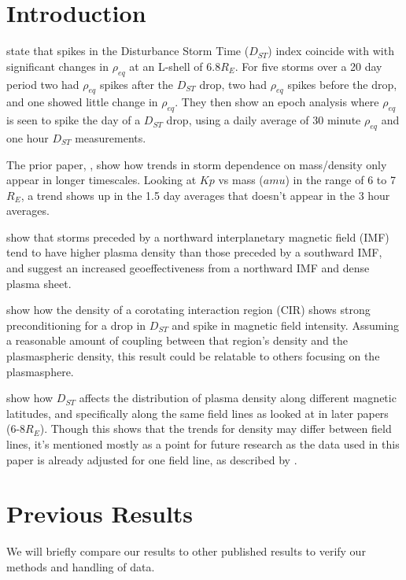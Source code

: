 \documentclass[10pt,twocolumn]{article}
\begin{document}
\section{Introduction}

\cite{Takahashi2010} state that spikes in the Disturbance Storm Time ($D_{ST}$) index coincide with with significant changes in $\rho_{eq}$ at an L-shell of 6.8$R_E$. For five storms over a 20 day period two had $\rho_{eq}$ spikes after the $D_{ST}$ drop, two had $\rho_{eq}$ spikes before the drop, and one showed little change in $\rho_{eq}$. They then show an epoch analysis where $\rho_{eq}$ is seen to spike the day of a $D_{ST}$ drop, using a daily average of 30 minute $\rho_{eq}$ and one hour $D_{ST}$ measurements. 

The prior paper, \cite{Takahashi2006}, show how trends in storm dependence on mass/density only appear in longer timescales. Looking at $Kp$ vs mass ($amu$) in the range of 6 to 7 $R_E$, a trend shows up in the 1.5 day averages that doesn't appear in the 3 hour averages.

\cite{Lavraud2006} show that storms preceded by a northward interplanetary magnetic field (IMF) tend to have higher plasma density than those preceded by a southward IMF, and suggest an increased geoeffectiveness from a northward IMF and dense plasma sheet.

\cite{Tsurutani1997} show how the density of a corotating interaction region (CIR) shows strong preconditioning for a drop in $D_{ST}$ and spike in magnetic field intensity. Assuming a reasonable amount of coupling between that region's density and the plasmaspheric density, this result could be relatable to others focusing on the plasmasphere. 

\cite{Denton2006} show how $D_{ST}$ affects the distribution of plasma density along different magnetic latitudes, and specifically along the same field lines as looked at in later papers (6-8$R_E$). Though this shows that the trends for density may differ between field lines, it's mentioned mostly as a point for future research as the data used in this paper is already adjusted for one field line, as described by \cite{Takahashi2010}.

\section{Previous Results}
We will briefly compare our results to other published results to verify our methods and handling of data. 
\end{document}
